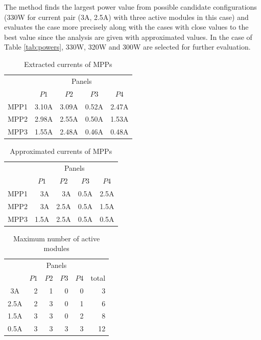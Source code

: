\documentclass[conference]{pvsctran}
\begin{document}
The method finds the largest power value from possible candidate configurations (330W for current pair (3A, 2.5A) with three active modules in this case) and evaluates the case more precisely along with the cases with close values to the best value since the analysis are given with approximated values. In the case of Table \ref{tab:powers}, 330W, 320W and 300W are selected for further evaluation. 

\begin{table}[t]
\caption{Extracted currents of MPPs}
\label{tab:monitored}
\centering
\begin{tabular}{c|rrrr}
\hline\hline
       &    	\multicolumn{4}{c}{Panels}								\\
	&	\multicolumn{1}{c}{$P1$}	&	\multicolumn{1}{c}{$P2$}	&	\multicolumn{1}{c}{$P3$}	&	\multicolumn{1}{c}{$P4$}	\\ \hline
MPP1	&	3.10A	&	3.09A	&	0.52A	&	2.47A	\\ \hline
MPP2	&	2.98A	&	2.55A	&	0.50A	&	1.53A	\\ \hline
MPP3	&	1.55A	&	2.48A	&	0.46A	&	0.48A	\\ \hline
\end{tabular}
\end{table}

\begin{table}[t]
\caption{Approximated currents of MPPs}
\label{tab:approximated}
\centering
\begin{tabular}{c|rrrr}	
\hline\hline
       &    	\multicolumn{4}{c}{Panels}	\\
	&	\multicolumn{1}{c}{$P1$}	&	\multicolumn{1}{c}{$P2$}	&	\multicolumn{1}{c}{$P3$}	&	\multicolumn{1}{c}{$P4$}	\\ \hline
MPP1	&	3A	&	3A	&	0.5A	&	2.5A	\\ \hline
MPP2	&	3A	&	2.5A	&	0.5A	&	1.5A	\\ \hline
MPP3	&	1.5A	&	2.5A	&	0.5A	&	0.5A	\\ \hline
\end{tabular}
\end{table}

\begin{table}[t]
\caption{Maximum number of active modules}
\label{tab:modules}
\centering
\begin{tabular}{c|rrrr|r}	
\hline\hline
       &    	\multicolumn{4}{c|}{Panels}	& \\									
	&	\multicolumn{1}{c}{$P1$}	&	\multicolumn{1}{c}{$P2$}	&	\multicolumn{1}{c}{$P3$}	&	\multicolumn{1}{c}{$P4$} &	\multicolumn{1}{|c}{total}	\\ \hline
3A	&	2	&	1	&	0	&	0 & 3	\\ \hline
2.5A	&	2	&	3	&	0	&	1 & 6	\\ \hline
1.5A	&	3	&	3	&	0	&	2 & 8	\\ \hline
0.5A	&	3	&	3	&	3	&	3 & 12	\\ \hline
\end{tabular}
\end{table}
\end{document}
